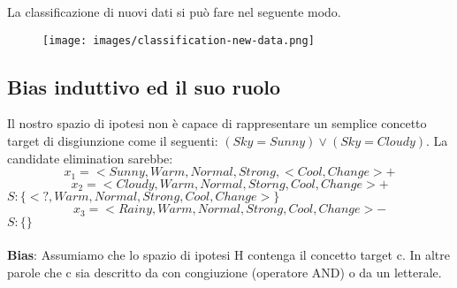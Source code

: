 La classificazione di nuovi dati si può fare nel seguente modo.
\begin{figure}[h!]
    \centering
    \texttt{[image: images/classification-new-data.png]}
\end{figure}

\subsection{Bias induttivo ed il suo ruolo}
Il nostro spazio di ipotesi non è capace di rappresentare un semplice concetto target di 
disgiunzione come il seguenti: $(Sky=Sunny) \lor (Sky=Cloudy)$. La candidate elimination sarebbe:
$$x_1 = <Sunny, Warm, Normal, Strong, <Cool, Change> + $$
$$x_2 = <Cloudy, Warm, Normal, Storng, Cool, Change> +$$
$S: \{<?, Warm, Normal, Strong, Cool, Change> \}$
$$x_3 = <Rainy, Warm, Normal, Strong, Cool, Change> -$$
$S: \{\}$\\\\
\textbf{Bias}: Assumiamo che lo spazio di ipotesi H contenga il concetto target c. In altre parole
che c sia descritto da con congiuzione (operatore AND) o da un letterale.

